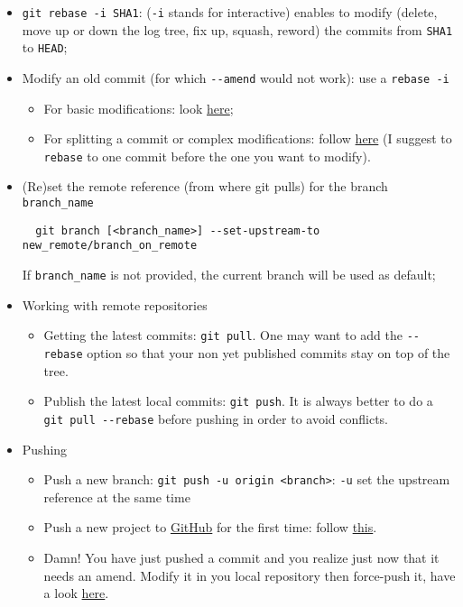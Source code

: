 \documentclass[a4paper,12pt,%
              final%
              ]{article}
\begin{document}
\begin{itemize}
\begin{itemize}
    \end{itemize}
  \item \verb|git rebase -i SHA1|: (\texttt{-i} stands for interactive) enables to modify (delete, move up or down the log tree, fix up, squash, reword) the commits from \texttt{SHA1} to \texttt{HEAD};
  \item Modify an old commit (for which \verb|--amend| would not work): use a \texttt{rebase -i}
    \begin{itemize}
      \item For basic modifications: look \href{https://stackoverflow.com/questions/1186535/how-to-modify-a-specified-commit}{here};
      \item For splitting a commit or complex modifications: follow \href{https://stackoverflow.com/questions/6217156/break-a-previous-commit-into-multiple-commits}{here} (I suggest to \texttt{rebase} to one commit before the one you want to modify).
    \end{itemize}
  \item (Re)set the remote reference (from where git pulls) for the branch \verb|branch_name|
\begin{verbatim}
  git branch [<branch_name>] --set-upstream-to new_remote/branch_on_remote
\end{verbatim}
    If \verb|branch_name| is not provided, the current branch will be used as default;
  \item Working with remote repositories
    \begin{itemize}
      \item Getting the latest commits: \verb|git pull|. One may want to add the \verb|--rebase| option so that your non yet published commits stay on top of the tree.
      \item Publish the latest local commits: \verb|git push|. It is always better to do a \verb|git pull --rebase| before pushing in order to avoid conflicts.
    \end{itemize}
  \item Pushing
    \begin{itemize}
      \item Push a new branch: \verb|git push -u origin <branch>|: \verb|-u| set the upstream reference at the same time
      \item Push a new project to \href{https://github.com/}{GitHub} for the first time: follow \href{https://help.github.com/en/github/importing-your-projects-to-github/adding-an-existing-project-to-github-using-the-command-line}{this}.
      \item Damn! You have just pushed a commit and you realize just now that it needs an amend. Modify it in you local repository then force-push it, have a look \href{https://stackoverflow.com/questions/179123/how-to-modify-existing-unpushed-commit-messages}{here}.

\end{itemize}
\end{itemize}
\end{document}
